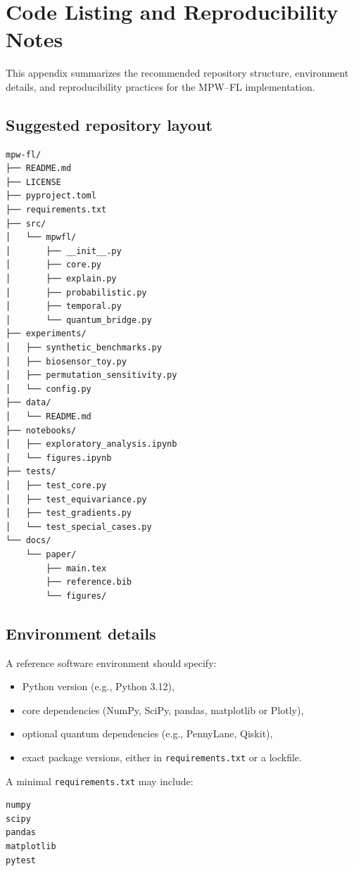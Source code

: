 \documentclass[11pt]{article}
\begin{document}
\section{Code Listing and Reproducibility Notes}
\label{app:reproducibility}

This appendix summarizes the recommended repository structure, environment details, and reproducibility practices for the MPW--FL implementation.

\subsection{Suggested repository layout}

\begin{verbatim}
mpw-fl/
├── README.md
├── LICENSE
├── pyproject.toml
├── requirements.txt
├── src/
│   └── mpwfl/
│       ├── __init__.py
│       ├── core.py
│       ├── explain.py
│       ├── probabilistic.py
│       ├── temporal.py
│       └── quantum_bridge.py
├── experiments/
│   ├── synthetic_benchmarks.py
│   ├── biosensor_toy.py
│   ├── permutation_sensitivity.py
│   └── config.py
├── data/
│   └── README.md
├── notebooks/
│   ├── exploratory_analysis.ipynb
│   └── figures.ipynb
├── tests/
│   ├── test_core.py
│   ├── test_equivariance.py
│   ├── test_gradients.py
│   └── test_special_cases.py
└── docs/
    └── paper/
        ├── main.tex
        ├── reference.bib
        └── figures/
\end{verbatim}

\subsection{Environment details}

A reference software environment should specify:
\begin{itemize}
  \item Python version (e.g., Python 3.12),
  \item core dependencies (NumPy, SciPy, pandas, matplotlib or Plotly),
  \item optional quantum dependencies (e.g., PennyLane, Qiskit),
  \item exact package versions, either in \texttt{requirements.txt} or a lockfile.
\end{itemize}

A minimal \texttt{requirements.txt} may include:
\begin{verbatim}
numpy
scipy
pandas
matplotlib
pytest
\end{verbatim}
\end{document}
